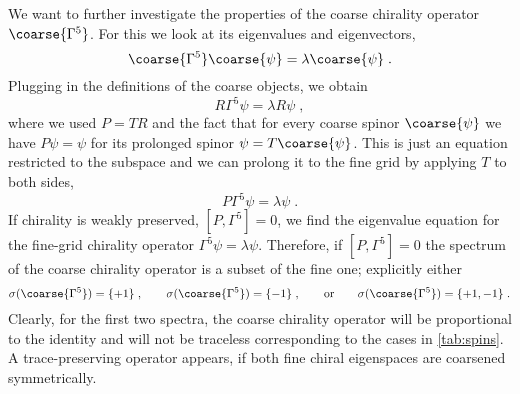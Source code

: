 We want to further investigate the properties of the coarse chirality operator $\coarse{\Gamma^{5}}$.
For this we look at its eigenvalues and eigenvectors,
\begin{equation}
\coarse{\Gamma^{5}} \coarse{\psi} = \lambda \coarse{\psi} \;.
\end{equation}
Plugging in the definitions of the coarse objects, we obtain
\begin{equation}
R \Gamma^{5} \psi = \lambda R \psi \;,
\end{equation}
where we used $P = TR$ and the fact that for every coarse spinor $\coarse{\psi}$ we have $P \psi = \psi$ for its prolonged spinor $\psi = T \coarse{\psi}$.
This is just an equation restricted to the subspace and we can prolong it to the fine grid by applying $T$ to both sides,
\begin{equation}
P \Gamma^{5} \psi = \lambda \psi \;.
\end{equation}
If chirality is weakly preserved, $[P, \Gamma^{5}] = 0$, we find the eigenvalue equation for the fine-grid chirality operator $\Gamma^{5} \psi = \lambda \psi$.
Therefore, if $[P, \Gamma^{5}] = 0$ the spectrum of the coarse chirality operator is a subset of the fine one; explicitly either
\begin{equation} \label{eq:sigma}
\sigma(\coarse{\Gamma^{5}}) = \{+1\} \;,
\qquad
\sigma(\coarse{\Gamma^{5}}) = \{-1\} \;,
\qquad
\text{or}
\qquad
\sigma(\coarse{\Gamma^{5}}) = \{+1, -1\} \;.
\end{equation}
Clearly, for the first two spectra, the coarse chirality operator will be proportional to the identity and will not be traceless corresponding to the cases  in \cref{tab:spins}.
A trace-preserving operator appears, if both fine chiral eigenspaces are coarsened symmetrically.


